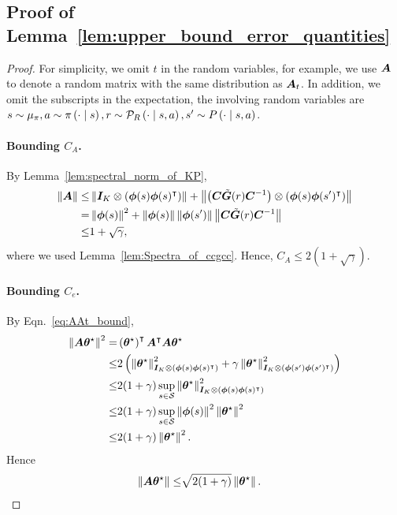 \subsection{Proof of Lemma~\ref{lem:upper_bound_error_quantities}}\label{appendix:proof_upper_bound_error_quantities}
\begin{proof}
For simplicity, we omit $t$ in the random variables, for example, we use ${\bm{A}}$ to denote a random matrix with the same distribution as ${\bm{A}}_t$.
In addition, we omit the subscripts in the expectation, the involving random variables are $s\sim\mu_{\pi}, a\sim\pi\left({\cdot\mid s}\right), r\sim{\mathcal{P}}_R\left({\cdot\mid s,a}\right), s^\prime\sim P\left({\cdot\mid s,a}\right)$.
\paragraph{Bounding $C_A$.}
By Lemma~\ref{lem:spectral_norm_of_KP},
\begin{equation*}
    \begin{aligned}
        \left\|{{\bm{A}}}\right\|\leq &\left\|{{\bm{I}}_K\otimes\left({{\bm{\phi}}(s){\bm{\phi}}(s)^{\intercal}}\right)}\right\|+\left\|{\left({{\bm{C}}\tilde{{\bm{G}}}(r){\bm{C}}^{-1}}\right)\otimes\left({{\bm{\phi}}(s){\bm{\phi}}(s^\prime)^{\intercal}}\right)}\right\|\\
        =&\left\|{{\bm{\phi}}(s)}\right\|^2+\left\|{{\bm{\phi}}(s)}\right\|\left\|{{\bm{\phi}}(s^\prime)}\right\|\left\|{{\bm{C}}\tilde{{\bm{G}}}(r){\bm{C}}^{-1}}\right\|\\
        \leq &1+\sqrt{\gamma},
    \end{aligned}
\end{equation*}
where we used Lemma~\ref{lem:Spectra_of_ccgcc}. 
Hence, $C_A\leq 2(1+\sqrt{\gamma})$.
\paragraph{Bounding $C_e$.}
By Eqn.~\eqref{eq:AAt_bound},
\begin{equation*}
    \begin{aligned}
        \left\|{{\bm{A}}{\bm{\theta}}^{\star}}\right\|^2=&\left({{\bm{\theta}}^{\star}}\right)^{\intercal}{\bm{A}}^{\intercal}{\bm{A}}{\bm{\theta}}^{\star}\\
        \leq& 2\left({\left\|{{\bm{\theta}}^{\star}}\right\|^2_{{\bm{I}}_K\otimes\left({{\bm{\phi}}(s){\bm{\phi}}(s)^{\intercal}}\right)}+\gamma\left\|{{\bm{\theta}}^{\star}}\right\|^2_{{\bm{I}}_K\otimes\left({{\bm{\phi}}(s^\prime){\bm{\phi}}(s^\prime)^{\intercal}}\right)}}\right)\\
        \leq&2(1+\gamma)\sup_{s\in{\mathcal{S}}}\left\|{{\bm{\theta}}^{\star}}\right\|_{{\bm{I}}_K\otimes\left({{\bm{\phi}}(s){\bm{\phi}}(s)^{\intercal}}\right)}^2\\
        \leq&2(1+\gamma)\sup_{s\in{\mathcal{S}}}\left\|{{\bm{\phi}}(s)}\right\|^2 \left\|{{\bm{\theta}}^{\star}}\right\|^2\\
        \leq& 2(1+\gamma)\left\|{{\bm{\theta}}^{\star}}\right\|^2.
    \end{aligned}
\end{equation*}
Hence
\begin{equation*}
    \begin{aligned}
        \left\|{{\bm{A}}{\bm{\theta}}^{\star}}\right\|\leq&\sqrt{2(1+\gamma)}\left\|{{\bm{\theta}}^{\star}}\right\|.
    \end{aligned}
\end{equation*}


\end{proof}
